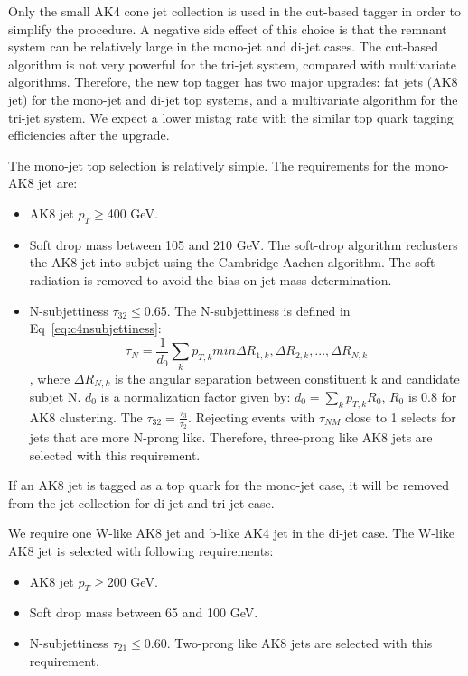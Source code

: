 Only the small AK4 cone jet collection is used in the cut-based tagger in order to simplify the procedure. A negative side effect of this choice is that the remnant system can be relatively large in the mono-jet and di-jet cases. The cut-based algorithm is not very powerful for the tri-jet system, compared with multivariate algorithms. Therefore, the new top tagger has two major upgrades: fat jets (AK8 jet) for the mono-jet and di-jet top systems, and a multivariate algorithm for the tri-jet system. We expect a lower mistag rate with the similar top quark tagging efficiencies after the upgrade. 

The mono-jet top selection is relatively simple. The requirements for the mono-AK8 jet are:
\begin{itemize}
\item AK8 jet $p_{T}\ge$400 GeV.
\item Soft drop mass\cite{Larkoski:2014wba} between 105 and 210 GeV. The soft-drop algorithm reclusters the AK8 jet into subjet using the Cambridge-Aachen algorithm\cite{Dokshitzer:1997in}. The soft radiation is removed to avoid the bias on jet mass determination.
\item N-subjettiness $\tau_{32}\le$0.65. The N-subjettiness is defined in Eq~\ref{eq:c4nsubjettiness}:
\begin{equation}
 \tau_{N}=\frac{1}{d_{0}}\sum_{k} p_{T,k}min{\Delta R_{1,k},\Delta R_{2,k},...,\Delta R_{N,k}}
 \label{eq:c4nsubjettiness}
\end{equation}
, where $\Delta R_{N,k}$ is the angular separation between constituent k and candidate subjet N. $d_{0}$ is a normalization factor given by: $d_{0}=\sum_{k}p_{T,k}R_{0}$, $R_{0}$ is 0.8 for AK8 clustering. The $\tau_{32}=\frac{\tau_{3}}{\tau_{2}}$. Rejecting events with $\tau_{NM}$ close to 1 selects for jets that are more N-prong like\cite{Cohen:2012yc}. Therefore, three-prong like AK8 jets are selected with this requirement.
\end{itemize}

If an AK8 jet is tagged as a top quark for the mono-jet case, it will be removed from the jet collection for di-jet and tri-jet case. 

We require one W-like AK8 jet and b-like AK4 jet in the di-jet case. The W-like AK8 jet is selected with following requirements:
\begin{itemize}
\item AK8 jet $p_{T}\ge$200 GeV.
\item Soft drop mass between 65 and 100 GeV.
\item N-subjettiness $\tau_{21}\le$0.60. Two-prong like AK8 jets are selected with this requirement.
\end{itemize}

